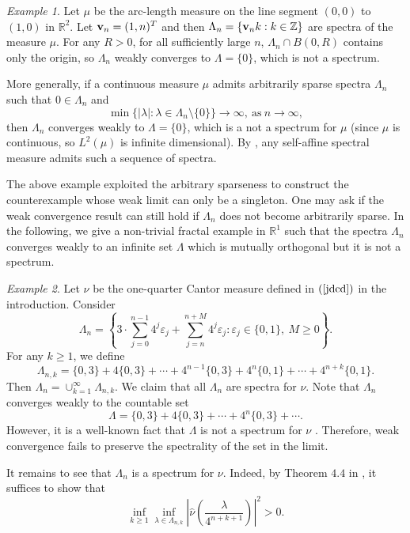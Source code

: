 \documentclass[reqno,a4paper,12pt]{amsart}
\numberwithin{equation}{section}
\newcommand{\R}{{\mathbb R}}
\newcommand{\Z}{{\mathbb Z}}
\newcounter{rem}
\theoremstyle{remark}
\newtheorem{example}{Example}[section]
\numberwithin{equation}{section}
\def\Z{\mathbb{Z}}
\def\R{\mathbb{R}}
\begin{document}
{\begin{example}
Let $\mu$ be the arc-length measure on the line segment $(0,0)$ to $(1,0)$ in $\R^2$. Let ${\bf v}_n = (1,n)^T$ and then $\Lambda_n = \{{\bf v}_n k: k\in\Z\}$ are spectra of the measure $\mu$.  For any $R>0$, for all sufficiently large $n$, $\Lambda_n\cap B(0,R)$ contains only the origin, so $\Lambda_n$ weakly converges to $\Lambda = \{0\}$, which is not a spectrum. 

More generally, if a continuous measure $\mu$ admits arbitrarily sparse spectra $\Lambda_n$  such that $0\in\Lambda_n$ and 
$$
\min\{|\lambda|: \lambda\in\Lambda_n\setminus \{0\}\}\to \infty, \ \mbox{as} \ n\to\infty,
$$
then $\Lambda_n$ converges weakly to $\Lambda = \{0\}$, which is a not a spectrum for $\mu$ (since $\mu$ is continuous, so $L^2(\mu)$ is infinite dimensional). By \cite{AL-2022}, any self-affine spectral measure admits such a sequence of spectra.  
\end{example}
The above example exploited the arbitrary sparseness to construct the counterexample whose weak limit can only be a singleton. One may ask if the weak convergence result can still hold if $\Lambda_n$ does not become arbitrarily sparse. In the following,  we give a non-trivial fractal example in $\R^1$ such that the spectra $\Lambda_n$ converges weakly to an infinite set $\Lambda$ which is mutually orthogonal but it is not a spectrum. 

\begin{example}
Let $\nu$ be the one-quarter Cantor measure defined in $(\ref{jdcd})$ in the introduction. Consider 
\[
\Lambda_n=\left\{3\cdot\sum_{j=0}^{n-1}4^{j}\varepsilon_j+\sum_{j=n}^{n+M}4^{j}\varepsilon_j: \varepsilon_j\in\{0,1\}, ~ M\ge 0\right\}.
\]
For any $k\geq1$, we define
\[\Lambda_{n,k}=
 \{0,3\}+4\{0,3\}+\cdots+4^{n-1}\{0,3\}+4^{n}\{0,1\}+\cdots+4^{n+k}\{0,1\}.\]
Then $\Lambda_n=\cup_{k=1}^{\infty} \Lambda_{n,k}$. We claim that all $\Lambda_n$ are spectra for $\nu$. Note that $\Lambda_n$ converges weakly to 
the countable set 
\[\Lambda=\{0,3\}+4\{0,3\}+\cdots+4^{n}\{0,3\}+\cdots.\]
However, it is a well-known fact that  $\Lambda$ is not a spectrum for $\nu$ \cite{dense}. Therefore, weak convergence fails to preserve the spectrality of the set in the limit. 


It remains to see that $\Lambda_n$ is a spectrum for $\nu$. Indeed, by Theorem $4.4$ in \cite{DHL}, it suffices to show that
\begin{equation}\label{eq-show}
    \inf_{k\geq1} \inf_{\lambda\in \Lambda_{n,k}}\left|\hat{\nu}\left(\frac{\lambda}{4^{n+k+1}}\right)\right|^{2} >0.
\end{equation}


\end{example}}
\end{document}
